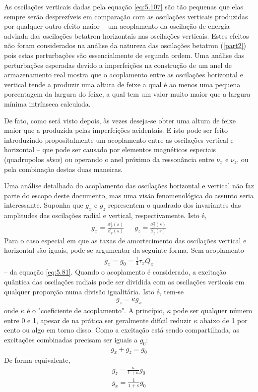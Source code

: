 As oscilações verticais dadas pela equação \eqref{eq:5.107} são tão pequenas que elas sempre serão desprezíveis em comparação com as oscilações verticais produzidas por qualquer outro efeito maior -- um acoplamento da oscilação de energia advinda das oscilações betatron horizontais nas oscilações verticais. Estes efeitos não foram considerados na análise da natureza das oscilações betatron (\autoref{part2}) pois estas perturbações são essencialmente de segunda ordem. Uma análise das perturbações esperadas devido a imperfeições na construção de um anel de armazenamento real mostra que o acoplamento entre as oscilações horizontal e vertical tende a produzir uma altura de feixe a qual é ao menos uma pequena porcentagem da largura do feixe, a qual tem um valor muito maior que a largura mínima intrínseca calculada.

De fato, como será visto depois, às vezes deseja-se obter uma altura de feixe maior que a produzida pelas imperfeições acidentais. E isto pode ser feito introduzindo propositalmente um acoplamento entre as oscilações vertical e horizontal -- que pode ser causado por elementos magnéticos especiais (quadrupolos \textit{skew}) ou operando o anel próximo da ressonância entre $\nu_x$ e $\nu_z$, ou pela combinação destas duas maneiras.

Uma análise detalhada do acoplamento das oscilações horizontal e vertical não faz parte do escopo deste documento, mas uma visão fenomenológica do assunto seria interessante. Suponha que $g_x$ e $g_z$ representem o quadrado dos invariantes das amplitudes das oscilações radial e vertical, respectivamente. Isto é,
\begin{align}
	g_x = \frac{\sigma_x^2(s)}{\beta_x(s)}\ \ \ \ \ \ \ g_z = \frac{\sigma_z^2(s)}{\beta_z(s)}\label{eq:5.109}
\end{align}
Para o caso especial em que as taxas de amortecimento das oscilações vertical e horizontal são iguais, pode-se argumentar da seguinte forma. Sem acoplamento
\begin{align}
	g_x = g_0 = \frac{1}{4} \tau_x Q_x
\end{align}
-- da equação \eqref{eq:5.81}. Quando o acoplamento é considerado, a excitação quântica das oscilações radiais pode ser dividida com as oscilações verticais em qualquer proporção numa divisão igualitária. Isto é, tem-se
\begin{align}
	g_z = \kappa g_x
\end{align}
onde $\kappa$ é o "coeficiente de acoplamento". A princípio, $\kappa$ pode ser qualquer número entre 0 e 1, apesar de na prática ser geralmente difícil reduzir $\kappa$ abaixo de 1 por cento ou algo em torno disso. Como a excitação está sendo compartilhada, as excitações combinadas precisam ser iguais a $g_0$:
\begin{align}
	g_x + g_z = g_0
\end{align}
De forma equivalente,
\begin{align}
	g_z = \frac{\kappa}{1+\kappa}g_0\\
	g_x = \frac{1}{1+\kappa}g_0
\end{align}

